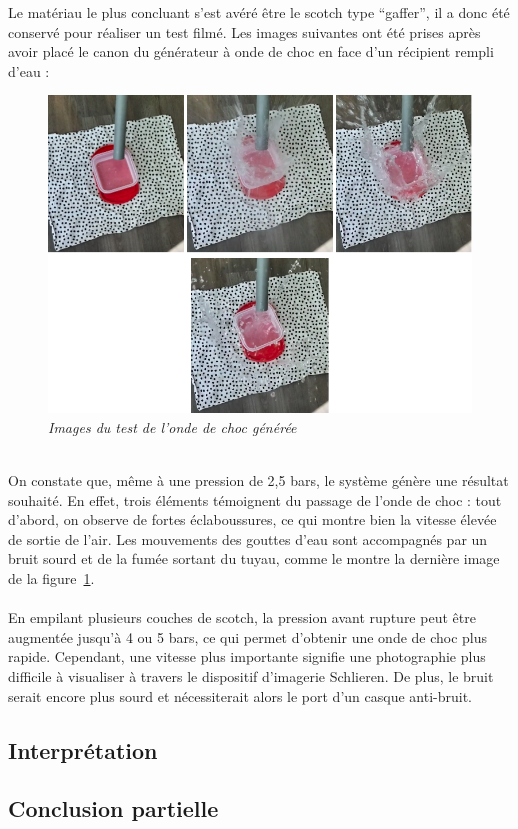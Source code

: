 Le matériau le plus concluant s’est avéré être le scotch type “gaffer”, il a donc été conservé pour réaliser un test filmé. Les images suivantes ont été prises après avoir placé le canon du générateur à onde de choc en face d’un récipient rempli d’eau : \\
\begin{figure}[ht]
	\centering
	\includegraphics[scale = 0.5]{figures/choc_filmee.png}
	\caption{\small{\textit{Images du test de l'onde de choc générée}}}
	\label{fig:choc_filmee}
\end{figure}
\\
On constate que, même à une pression de 2,5 bars, le système génère une résultat souhaité. En effet, trois éléments témoignent du passage de l’onde de choc : tout d’abord, on observe de fortes éclaboussures, ce qui montre bien la vitesse élevée de sortie de l’air. Les mouvements des gouttes d’eau  sont accompagnés par un bruit sourd et de la fumée sortant du tuyau, comme le montre la dernière image de la figure~\ref{fig:choc_filmee}.\\\\
En empilant plusieurs couches de scotch, la pression avant rupture peut être augmentée jusqu’à 4 ou 5 bars, ce qui permet d’obtenir une onde de choc plus rapide. Cependant, une vitesse plus importante signifie une photographie plus difficile à visualiser à travers le dispositif d’imagerie Schlieren. De plus, le bruit serait encore plus sourd et nécessiterait alors le port d’un casque anti-bruit. 
\subsection{Interprétation}
\subsection{Conclusion partielle}
